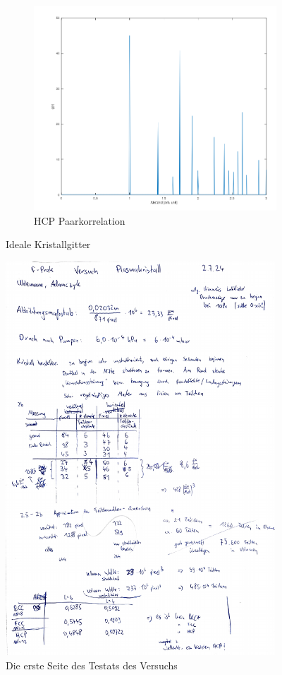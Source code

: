 \documentclass[12pt,a4paper,ngerman]{article}
\begin{document}
\begin{figure}
	\begin{subfigure}[b]{0.3\textwidth}
		\includegraphics[width=\textwidth]{data/HCP_perfect_paarcorr.png}
		\caption{HCP Paarkorrelation}
	\end{subfigure}
		
	\caption{Ideale Kristallgitter}
	\label{fig:Ideal}
\end{figure}

 \begin{figure}[ht]
 	\centering
 	\includegraphics[width=0.9\textwidth, page=1]{data/Testat_Plasmakristall.pdf}		
 	\caption[Testat 1]{Die erste Seite des Testats des Versuchs}
 	\label{fig:Testat}
 \end{figure}
\end{document}
